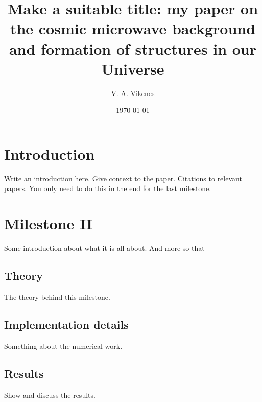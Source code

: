 

 

   \title{Make a suitable title: my paper on the cosmic microwave background and formation of structures in our Universe}

   \author{V. A. Vikenes}


   \date{\today}



   \maketitle

\section{Introduction}
Write an introduction here. Give context to the paper. Citations to relevant papers. You only need to do this in the end for the last milestone.





\section{Milestone II} 
Some introduction about what it is all about. And more so that 


\subsection{Theory}
The theory behind this milestone.

\subsection{Implementation details}
Something about the numerical work.

\subsection{Results}
Show and discuss the results.

